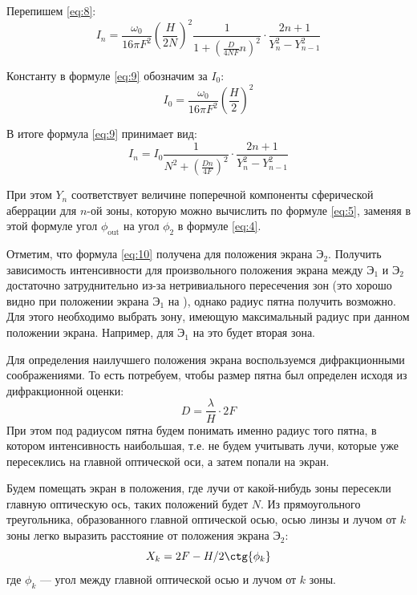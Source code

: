 \documentclass[a4paper, 12pt]{article}
\begin{document}
Перепишем \eqref{eq:8}:
\begin{equation}
    I_n = \frac{\omega_0}{16\pi F^2} \left( \frac{H}{2 N} \right)^2
    \frac{1}{1+\left( \frac{D}{4 N F}n \right)^2} \cdot
    \frac{2n+1}{Y_n^2-Y_{n-1}^2}
    \label{eq:9}
\end{equation}

Константу в формуле \eqref{eq:9} обозначим за $I_0$:
\[
    I_0 = \frac{\omega_0}{16\pi F^2}\left( \frac{H}{2} \right)^2
\]

В итоге формула \eqref{eq:9} принимает вид:
\begin{equation}
    I_n = I_0 \frac{1}{N^2+\left( \frac{Dn}{4F} \right)^2} \cdot
    \frac{2n+1}{Y_n^2-Y_{n-1}^2} 
    \label{eq:10}
\end{equation}

При этом $Y_n$ соответствует величине поперечной компоненты
сферической аберрации для $n$-ой зоны, которую можно вычислить по
формуле \eqref{eq:5}, заменяя в этой формуле угол $\phi_\text{out}$ на
угол $\phi_2$ в формуле \eqref{eq:4}. 

Отметим, что формула \eqref{eq:10} получена для положения экрана
$\text{Э}_2$. Получить зависимость интенсивности для произвольного
положения экрана между $\text{Э}_1$ и $\text{Э}_2$ достаточно
затруднительно из-за нетривиального пересечения зон (это хорошо видно
при положении экрана $\text{Э}_1$ на ), однако радиус пятна
получить возможно. Для этого необходимо выбрать зону, имеющую
максимальный радиус при данном положении экрана. Например, для
$\text{Э}_1$ на  это будет вторая зона.

Для определения наилучшего положения экрана воспользуемся
дифракционными соображениями. То есть потребуем, чтобы размер пятна
был определен исходя
из дифракционной оценки:
\begin{equation}
    D = \frac{\lambda}{H}\cdot 2F
    \label{eq:11}
\end{equation}
При этом под радиусом пятна будем понимать именно радиус того пятна, в котором
интенсивность наибольшая, т.е. не будем учитывать лучи, которые уже
пересеклись на главной оптической оси, а затем попали на экран. 

Будем помещать экран в положения, где лучи от какой-нибудь зоны
пересекли главную оптическую ось, таких положений будет $N$. Из
прямоугольного треугольника, образованного главной оптической осью,
осью линзы и лучом от $k$ зоны легко выразить расстояние от положения
экрана $\text{Э}_2$:
\begin{equation}
    X_k = 2F-H/2 \ctg{\phi_k}
    \label{eq:12}
\end{equation}
где $\phi_k$ --- угол между главной оптической осью и лучом от
$k$ зоны. 
\end{document}
